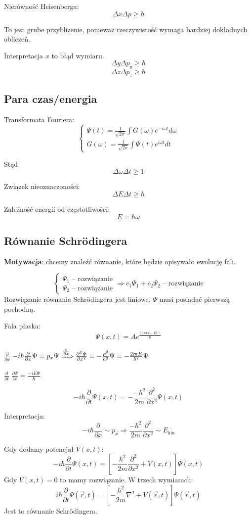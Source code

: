 Nierówność Heisenberga:
\[
\Delta x \Delta p \geq \hbar
\]

To jest grube przybliżenie, ponieważ rzeczywistość wymaga bardziej dokładnych obliczeń.

Interpretacja $x$ to błąd wymiaru.
\[
\Delta y \Delta p_y \geq \hbar
\]
\[
\Delta z \Delta p_z \geq \hbar
\]

\subsection{Para czas/energia}
Transformata Fouriera:
\[
\begin{cases}
\Psi(t) = \frac{1}{\sqrt{2\pi}} \int G(\omega) e^{-i\omega t} d\omega\\
G(\omega) = \frac{1}{\sqrt{2\pi}} \int \Psi(t) e^{i\omega t} dt
\end{cases}
\]

Stąd
\[
\Delta \omega \Delta t \geq 1
\]

Związek nieoznaczoności:
\[
\Delta E \Delta t \geq \hbar
\]

Zależność energii od częstotliwości:
\[
E = \hbar \omega
\]

\subsection{Równanie Schrödingera}

\textbf{Motywacja}: chcemy znaleźć równanie, które będzie opisywało ewolucję fali.

\[
\begin{cases}
    \Psi_1 \text{ -- rozwiązanie} \\
    \Psi_2 \text{ -- rozwiązanie}
\end{cases} \Rightarrow c_1 \Psi_1 + c_2 \Psi_2 \text{ -- rozwiązanie}
\]
Rozwiązanie równania Schrödingera jest liniowe. $\Psi$ musi posiadać pierwszą pochodną.

Fala płaska:
\[
\Psi(x,t) = A e^{\frac{i(px x - Et)}{\hbar}}
\]

$\frac{\partial}{\partial x}$ $-i \hbar \frac{\partial}{\partial x} \Psi = p_x \Psi \xRightarrow{\frac{\partial}{\partial x}} \frac{\partial^2\Psi}{\partial x^2} = -\frac{p^2}{\hbar^2} \Psi = -\frac{2mE}{\hbar^2} \Psi$

$\frac{\partial}{\partial t}$ $\frac{\partial\Psi}{\partial t} = \frac{-iE\Psi}{\hbar}$

\[
-i\hbar \frac{\partial}{\partial t} \Psi(x, t) = -\frac{-\hbar^2}{2m} \frac{\partial^2}{\partial x^2} \Psi(x, t)
\]

Interpretacja:
\[
-i\hbar \frac{\partial}{\partial x} \sim p_x \Rightarrow \frac{-\hbar^2}{2m} \frac{\partial^2}{\partial x^2} \sim E_{\text{kin}}
\]

Gdy dodamy potencjał $V(x,t)$:
\[
-i\hbar \frac{\partial}{\partial t} \Psi(x,t) = \left[ -\frac{\hbar^2}{2m} \frac{\partial^2}{\partial x^2} + V(x,t) \right] \Psi(x,t)
\]
Gdy $V(x,t) = 0$ to mamy rozwiązanie.
W trzech wymiarach:
\[
i\hbar \frac{\partial}{\partial t} \Psi(\vec{r},t) = \left[ -\frac{\hbar^2}{2m} \nabla^2 + V(\vec{r},t) \right] \Psi(\vec{r},t)
\]
Jest to równanie Schrödingera.
